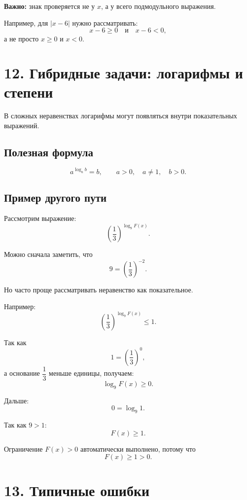 \documentclass[a4paper,12pt]{article}
\newcommand{\sectionline}{\vspace{0.35em}{\color{accent}\hrule height 0.6pt}\vspace{0.65em}}
\newcommand{\important}[1]{\textcolor{darkaccent}{\textbf{#1}}}
\begin{document}
\important{Важно:} знак проверяется не у $x$, а у всего подмодульного выражения.

Например, для $|x-6|$ нужно рассматривать:
\[
x-6\ge0
\quad \text{и} \quad
x-6<0,
\]
а не просто $x\ge0$ и $x<0$.

\section*{\textcolor{darkaccent}{12. Гибридные задачи: логарифмы и степени}}
\sectionline

В сложных неравенствах логарифмы могут появляться внутри показательных выражений.

\subsection*{\textcolor{accent}{Полезная формула}}

\[
a^{\log_a b}=b,
\qquad a>0,\quad a\ne1,\quad b>0.
\]

\subsection*{\textcolor{accent}{Пример другого пути}}

Рассмотрим выражение:
\[
\left(\frac13\right)^{\log_9 F(x)}.
\]

Можно сначала заметить, что
\[
9=\left(\frac13\right)^{-2}.
\]

Но часто проще рассматривать неравенство как показательное.

Например:
\[
\left(\frac13\right)^{\log_9 F(x)}\le1.
\]

Так как
\[
1=\left(\frac13\right)^0,
\]
а основание $\dfrac13$ меньше единицы, получаем:
\[
\log_9 F(x)\ge0.
\]

Дальше:
\[
0=\log_9 1.
\]

Так как $9>1$:
\[
F(x)\ge1.
\]

Ограничение $F(x)>0$ автоматически выполнено, потому что
\[
F(x)\ge1>0.
\]

\section*{\textcolor{darkaccent}{13. Типичные ошибки}}
\sectionline
\end{document}
